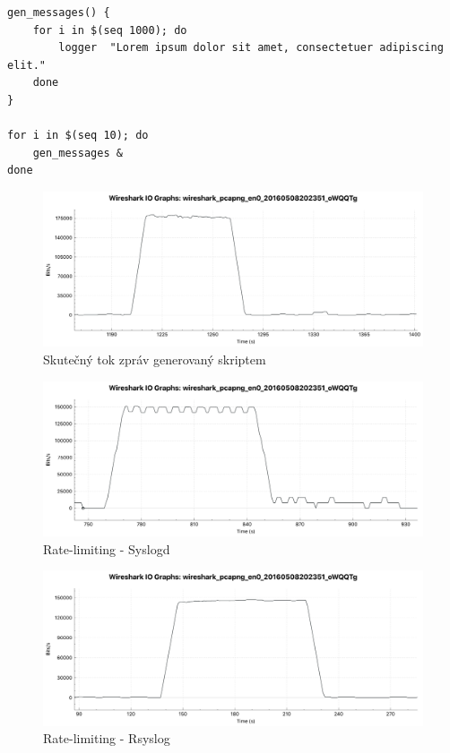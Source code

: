 \documentclass[thesis=B,czech]{FITthesis}[2012/06/26]
\begin{document}
\begin{lstlisting}[style=AshStyle]
gen_messages() {
	for i in $(seq 1000); do
		logger 	"Lorem ipsum dolor sit amet, consectetuer adipiscing elit."
	done
}

for i in $(seq 10); do
	gen_messages &
done
\end{lstlisting}

\begin{figure}[H]
	\centering
	\includegraphics[scale=0.36]{images/test-rateLim-rsyslog-Buff-off}
	\caption[Tok zpráv generovaný skriptem]{Skutečný tok zpráv generovaný skriptem}
\end{figure}
\begin{figure}[H]
	\centering
	\includegraphics[scale=0.36]{images/test-rateLim-syslogd}
	\caption[Rate-limiting - Syslogd]{Rate-limiting - Syslogd}
\end{figure}
\begin{figure}[H]
	\centering
	\includegraphics[scale=0.36]{images/test-rateLim-rsyslog}
	\caption[Rate-limiting - Rsyslog]{Rate-limiting - Rsyslog}
\end{figure}
\end{document}
